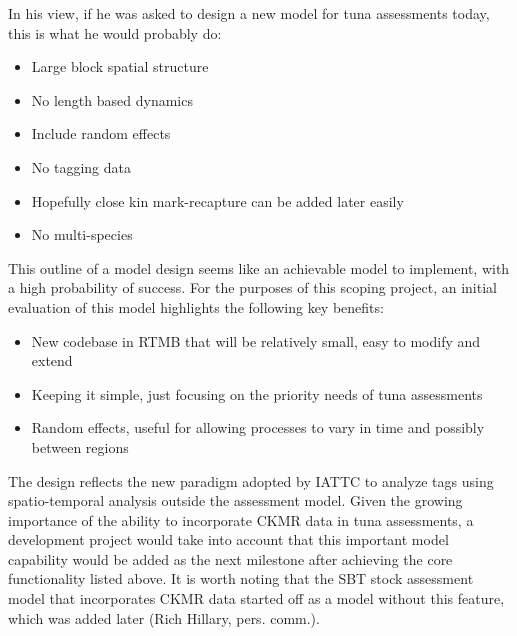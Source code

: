 \documentclass{SCreport}
\begin{document}
\vspace{2ex}

In his view, if he was asked to design a new model for tuna assessments today,
this is what he would probably do:

\begin{itemize}
  \item Large block spatial structure\\[-4.5ex]
  \item No length based dynamics\\[-4.5ex]
  \item Include random effects\\[-4.5ex]
  \item No tagging data\\[-4.5ex]
  \item Hopefully close kin mark-recapture can be added later easily\\[-4.5ex]
  \item No multi-species
\end{itemize}

\vspace{2ex}

This outline of a model design seems like an achievable model to implement, with
a high probability of success. For the purposes of this scoping project, an
initial evaluation of this model highlights the following key benefits:

\begin{itemize}
  \item New codebase in RTMB that will be relatively small, easy to modify and
  extend\\[-4.5ex]
  \item Keeping it simple, just focusing on the priority needs of tuna
  assessments\\[-4.5ex]
  \item Random effects, useful for allowing processes to vary in time and
  possibly between regions
\end{itemize}

\vspace{2ex}

The design reflects the new paradigm adopted by IATTC to analyze tags using
spatio-temporal analysis outside the assessment model. Given the growing
importance of the ability to incorporate CKMR data in tuna assessments, a
development project would take into account that this important model capability
would be added as the next milestone after achieving the core functionality
listed above. It is worth noting that the SBT stock assessment model that
incorporates CKMR data started off as a model without this feature, which was
added later (Rich Hillary, pers. comm.).
\end{document}
